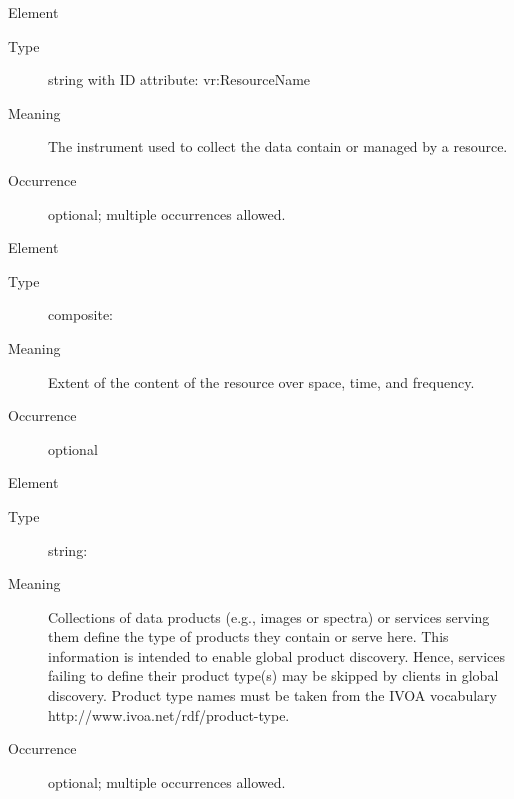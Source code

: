 \documentclass[11pt,a4paper]{ivoa}
\begin{document}
\begin{generated}
\begin{bigdescription}
\begin{description}
\end{description}
\item[Element \xmlel{instrument}]
\begin{description}
\item[Type] string with ID attribute: vr:ResourceName
\item[Meaning]
                     The instrument used to collect the data contain or
                     managed by a resource.

\item[Occurrence] optional; multiple occurrences allowed.

\end{description}
\item[Element \xmlel{coverage}]
\begin{description}
\item[Type] composite: 
\item[Meaning]
                     Extent of the content of the resource over space, time,
                     and frequency.

\item[Occurrence] optional

\end{description}
\item[Element \xmlel{productTypeServed}]
\begin{description}
\item[Type] string: 
\item[Meaning]
	              		Collections of data products (e.g., images or spectra)
	              		or services serving them define the type of products
	              		they contain or serve here.  This information is intended
	              		to enable global product discovery.  Hence, services
	              		failing to define their product type(s) may be skipped
	              		by clients in global discovery.  Product type names must
	              		be taken from the IVOA vocabulary
	              		http://www.ivoa.net/rdf/product-type.
	              	
\item[Occurrence] optional; multiple occurrences allowed.

\end{description}


\end{bigdescription}\endgroup

\endgroup
\end{generated}
\end{document}
